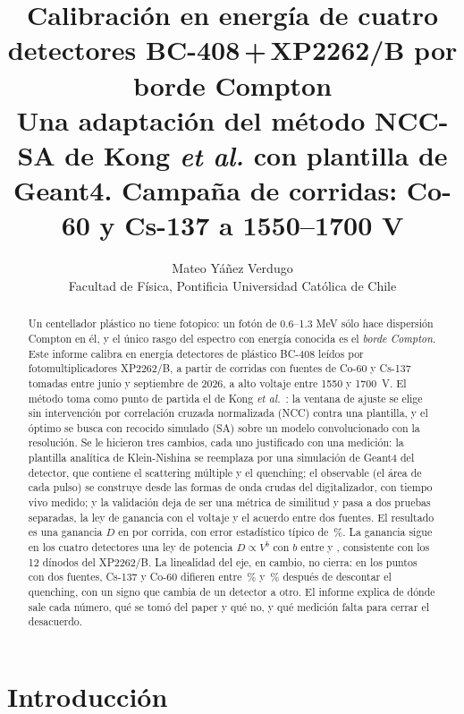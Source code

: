 \documentclass[11pt,a4paper]{article}
\title{\color{azul}\bfseries Calibración en energía de cuatro detectores
       BC-408\,+\,XP2262/B por borde Compton\\[2mm]
       \normalsize\mdseries\color{black}
       Una adaptación del método NCC-SA de Kong \emph{et al.} con plantilla
       de Geant4. Campaña de \NCorridas{} corridas: Co-60 y Cs-137 a
       1550--1700 V}
\author{Mateo Yáñez Verdugo\\[1mm]
        \small Facultad de Física, Pontificia Universidad Católica de Chile}
\date{\FechaInforme}
\begin{document}
\maketitle

\begin{abstract}
\noindent
Un centellador plástico no tiene fotopico: un fotón de 0.6--1.3 MeV sólo
hace dispersión Compton en él, y el único rasgo del espectro con energía
conocida es el \emph{borde Compton}. Este informe calibra en energía
\NDetectores{} detectores de plástico BC-408 leídos por fotomultiplicadores
XP2262/B, a partir de \NCorridas{} corridas con fuentes de Co-60 y Cs-137
tomadas entre junio y septiembre de 2026, a alto voltaje entre 1550 y
1700~V. El método toma como punto de partida el de Kong
\emph{et al.}~\cite{kong2025}: la ventana de ajuste se elige sin intervención
por correlación cruzada normalizada (NCC) contra una plantilla, y el óptimo
se busca con recocido simulado (SA) sobre un modelo convolucionado con la
resolución. Se le hicieron tres cambios, cada uno justificado con una
medición: la plantilla analítica de Klein-Nishina se reemplaza por una
simulación de Geant4 del detector, que contiene el scattering múltiple y el
quenching; el observable (el área de cada pulso) se construye desde las
formas de onda crudas del digitalizador, con tiempo vivo medido; y la
validación deja de ser una métrica de similitud y pasa a dos pruebas
separadas, la ley de ganancia con el voltaje y el acuerdo entre dos fuentes.
El resultado es una ganancia $D$ en \DkeV{} por corrida, con error
estadístico típico de \ErrRelMediano\,\%. La ganancia sigue en los cuatro
detectores una ley de potencia $D \propto V^{b}$ con $b$ entre \BMin{} y
\BMax{}, consistente con los 12 dínodos del XP2262/B. La linealidad del eje,
en cambio, no cierra: en los \NPuntosTestA{} puntos con dos fuentes, Cs-137
y Co-60 difieren entre \DesacMin\,\% y \DesacMax\,\% después de descontar el
quenching, con un signo que cambia de un detector a otro. El informe explica
de dónde sale cada número, qué se tomó del paper y qué no, y qué medición
falta para cerrar el desacuerdo.
\end{abstract}

\tableofcontents
\bigskip

\section{Introducción}
\label{sec:intro}
\end{document}
